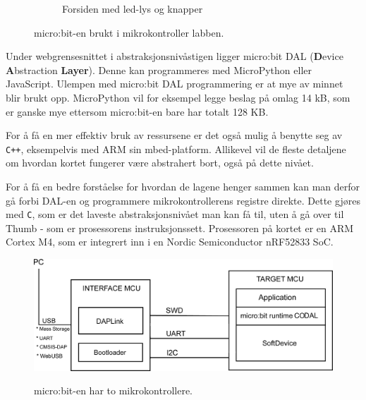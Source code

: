\begin{alphasection}
\begin{figure}[H]
\begin{subfigure}{0.5\textwidth}
        \caption{Forsiden med led-lys og knapper}
        \label{fig:deform}
    \end{subfigure}
    \caption{micro:bit-en brukt i mikrokontroller labben.}
    \label{fig:micro:bit}
\end{figure}



Under webgrensesnittet i abstraksjonsnivåstigen ligger micro:bit {DAL} (\textbf{D}evice \textbf{A}bstraction \textbf{Layer}). Denne kan programmeres med MicroPython eller JavaScript. Ulempen med micro:bit DAL programmering er at mye av minnet blir brukt opp. MicroPython vil for eksempel legge beslag på omlag 14 kB, som er ganske mye ettersom micro:bit-en bare har totalt 128 KB.

For å få en mer effektiv bruk av ressursene er det også mulig å benytte seg av \verb|C++|, eksempelvis med ARM sin mbed-platform. Allikevel vil de fleste detaljene om hvordan kortet fungerer være abstrahert bort, også på dette nivået.

For å få en bedre forståelse for hvordan de lagene henger sammen kan man derfor gå forbi DAL-en og programmere mikrokontrollerens registre direkte. Dette gjøres med \verb|C|, som er det laveste abstraksjonsnivået man kan få til, uten å gå over til Thumb - som er prosessorens instruksjonssett. Prosessoren på kortet er en ARM Cortex M4, som er integrert inn i en Nordic Semiconductor nRF52833 SoC.

\begin{figure}[H]
    \centering
        \includegraphics[width=0.8\linewidth]{Main/figures/microbit_interface.png}
        \label{fig:deform}
    \caption{micro:bit-en har to mikrokontrollere.}
    \label{fig:micro:bit-interface}
\end{figure}


\end{alphasection}
